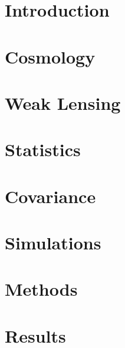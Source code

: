\documentclass[11pt,a4paper]{ipmu}
\begin{document}
\makethesistitle
\frontmatter
%     


\tableofcontents  %
\listoffigures    %
\listoftables     %


\chapter{Introduction}
\label{chap:introduction}
\mainmatter
\minitoc 


\chapter{Cosmology}
\label{chap:cosmology}
\minitoc 


\chapter{Weak Lensing}
\label{chap:weak_lensing}
\minitoc 


\chapter{Statistics}
\label{chap:statistics}
\minitoc 


\chapter{Covariance}
\label{chap:covariance}
\minitoc 


\chapter{Simulations}
\label{chap:simulation}
\minitoc 


\chapter{Methods}
\label{chap:methods}
\minitoc 


\chapter{Results}
\label{chap:results}
\minitoc 

\end{document}
